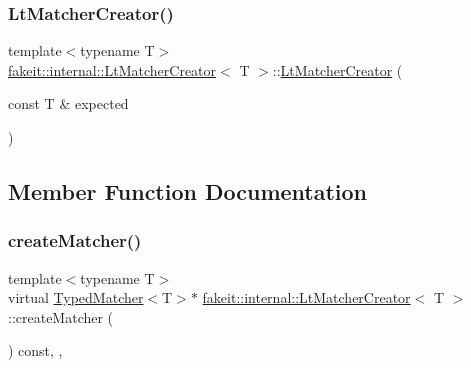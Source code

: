 \mbox{\label{structfakeit_1_1internal_1_1LtMatcherCreator_ab8164ead0551b2b74d936d590b970392}} 
\subsubsection{\texorpdfstring{LtMatcherCreator()}{LtMatcherCreator()}\hspace{0.1cm}{\footnotesize\ttfamily [9/9]}}
{\footnotesize\ttfamily template$<$typename T$>$ \\
\mbox{\hyperlink{structfakeit_1_1internal_1_1LtMatcherCreator}{fakeit\+::internal\+::\+Lt\+Matcher\+Creator}}$<$ T $>$\+::\mbox{\hyperlink{structfakeit_1_1internal_1_1LtMatcherCreator}{Lt\+Matcher\+Creator}} (\begin{DoxyParamCaption}\item[{const T \&}]{expected }\end{DoxyParamCaption})\hspace{0.3cm}{\ttfamily [inline]}}



\subsection{Member Function Documentation}
\mbox{\label{structfakeit_1_1internal_1_1LtMatcherCreator_a3eb22e77b3c4622fa47160d9bc689c8e}} 
\subsubsection{\texorpdfstring{createMatcher()}{createMatcher()}\hspace{0.1cm}{\footnotesize\ttfamily [1/9]}}
{\footnotesize\ttfamily template$<$typename T$>$ \\
virtual \mbox{\hyperlink{structfakeit_1_1TypedMatcher}{Typed\+Matcher}}$<$T$>$$\ast$ \mbox{\hyperlink{structfakeit_1_1internal_1_1LtMatcherCreator}{fakeit\+::internal\+::\+Lt\+Matcher\+Creator}}$<$ T $>$\+::create\+Matcher (\begin{DoxyParamCaption}{ }\end{DoxyParamCaption}) const\hspace{0.3cm}{\ttfamily [inline]}, {\ttfamily [override]}, {\ttfamily [virtual]}}



